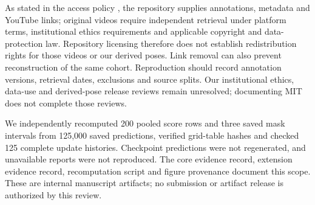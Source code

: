 \documentclass{article}
\begin{document}
As stated in the access policy \citep{ref15}, the repository supplies annotations, metadata and YouTube links; original videos require independent retrieval under platform terms, institutional ethics requirements and applicable copyright and data-protection law. Repository licensing therefore does not establish redistribution rights for those videos or our derived poses. Link removal can also prevent reconstruction of the same cohort. Reproduction should record annotation versions, retrieval dates, exclusions and source splits. Our institutional ethics, data-use and derived-pose release reviews remain unresolved; documenting MIT does not complete those reviews.

We independently recomputed 200 pooled score rows and three saved mask intervals from 125,000 saved predictions, verified grid-table hashes and checked 125 complete update histories. Checkpoint predictions were not regenerated, and unavailable reports were not reproduced. The {core evidence record}, {extension evidence record}, {recomputation script} and {figure provenance} document this scope. These are internal manuscript artifacts; no submission or artifact release is authorized by this review.
\label{physworld:main-last}
\clearpage
\label{physworld:references-start}
\end{document}
